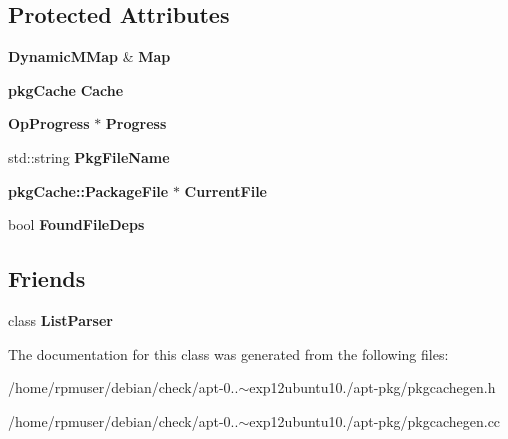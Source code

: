 \subsection*{\-Protected \-Attributes}
\begin{DoxyCompactItemize}
\item 
{\bf \-Dynamic\-M\-Map} \& {\bfseries \-Map}\label{classpkgCacheGenerator_adc0c5b928b6060ced0d3323742f7883a}

\item 
{\bf pkg\-Cache} {\bfseries \-Cache}\label{classpkgCacheGenerator_a26c4fabad3657344ca6a4b1e25a842dc}

\item 
{\bf \-Op\-Progress} $\ast$ {\bfseries \-Progress}\label{classpkgCacheGenerator_a926d37269e144f3ed29f063664b270bc}

\item 
std\-::string {\bfseries \-Pkg\-File\-Name}\label{classpkgCacheGenerator_a0049294d45ee49774a46d487fa73e83a}

\item 
{\bf pkg\-Cache\-::\-Package\-File} $\ast$ {\bfseries \-Current\-File}\label{classpkgCacheGenerator_a02726a8d56490ca4bce9ca2e9001d411}

\item 
bool {\bfseries \-Found\-File\-Deps}\label{classpkgCacheGenerator_a8a31c3587cc062cc70781abfbd3141a9}

\end{DoxyCompactItemize}
\subsection*{\-Friends}
\begin{DoxyCompactItemize}
\item 
class {\bfseries \-List\-Parser}\label{classpkgCacheGenerator_a64990507f149a60e81401427b693d8a9}

\end{DoxyCompactItemize}


\-The documentation for this class was generated from the following files\-:\begin{DoxyCompactItemize}
\item 
/home/rpmuser/debian/check/apt-\/0..$\sim$exp12ubuntu10./apt-\/pkg/pkgcachegen.\-h\item 
/home/rpmuser/debian/check/apt-\/0..$\sim$exp12ubuntu10./apt-\/pkg/pkgcachegen.\-cc\end{DoxyCompactItemize}
